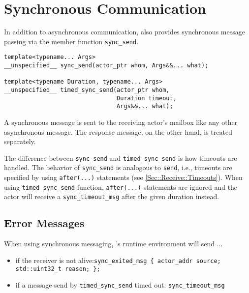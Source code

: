 \section{Synchronous Communication}
\label{Sec::Sync}

In addition to asynchronous communication, \ba also provides synchronous message passing via the member function \lstinline^sync_send^.

\begin{lstlisting}
template<typename... Args>
__unspecified__ sync_send(actor_ptr whom, Args&&... what);

template<typename Duration, typename... Args>
__unspecified__ timed_sync_send(actor_ptr whom,
                                Duration timeout,
                                Args&&... what);

\end{lstlisting}

A synchronous message is sent to the receiving actor's mailbox like any other asynchronous message.
The response message, on the other hand, is treated separately.

The difference between \lstinline^sync_send^ and \lstinline^timed_sync_send^ is how timeouts are handled.
The behavior of \lstinline^sync_send^ is analogous to \lstinline^send^, i.e., timeouts are specified by using \lstinline^after(...)^ statements (see \ref{Sec::Receive::Timeouts}).
When using \lstinline^timed_sync_send^ function, \lstinline^after(...)^ statements are ignored and the actor will receive a \lstinline^sync_timeout_msg^ after the given duration instead.

\subsection{Error Messages}

When using synchronous messaging, \ba's runtime environment will send ...

\begin{itemize}
\item if the receiver is not alive:\newline\lstinline^sync_exited_msg { actor_addr source; std::uint32_t reason; };^
\item if a message send by \lstinline^timed_sync_send^ timed out: \lstinline^sync_timeout_msg^
\end{itemize}

